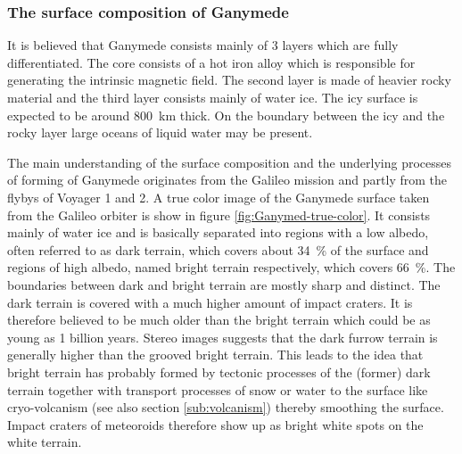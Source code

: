 \subsubsection{The surface composition of Ganymede}

It is believed that Ganymede consists mainly of 3 layers which are
fully differentiated. The core consists of a hot iron alloy which
is responsible for generating the intrinsic magnetic field. The second
layer is made of heavier rocky material and the third layer consists
mainly of water ice. The icy surface is expected to be around 800~km
thick. On the boundary between the icy and the rocky layer large oceans
of liquid water may be present\cite{bagenal2007jupiter}.

The main understanding of the surface composition and the underlying
processes of forming of Ganymede originates from the Galileo mission
and partly from the flybys of Voyager 1 and 2. A true color image
of the Ganymede surface taken from the Galileo orbiter is show in
figure \ref{fig:Ganymed-true-color}. It consists mainly of water
ice and is basically separated into regions with a low albedo, often
referred to as dark terrain, which covers about 34~\% of the surface
and regions of high albedo, named bright terrain respectively, which
covers 66~\%\cite{bagenal2007jupiter}. The boundaries between dark
and bright terrain are mostly sharp and distinct. The dark terrain
is covered with a much higher amount of impact craters. It is therefore
believed to be much older than the bright terrain which could be as
young as 1 billion years\cite{Showman2004}. Stereo images suggests
that the dark furrow terrain is generally higher than the grooved
bright terrain. This leads to the idea that bright terrain has probably
formed by tectonic processes of the (former) dark terrain together
with transport processes of snow or water to the surface like cryo-volcanism
(see also section \ref{sub:volcanism}) thereby smoothing the surface.
Impact craters of meteoroids therefore show up as bright white spots
on the white terrain\cite{Schenk2001,Patterson2010,bagenal2007jupiter,Showman1997,Showman2004}. 

